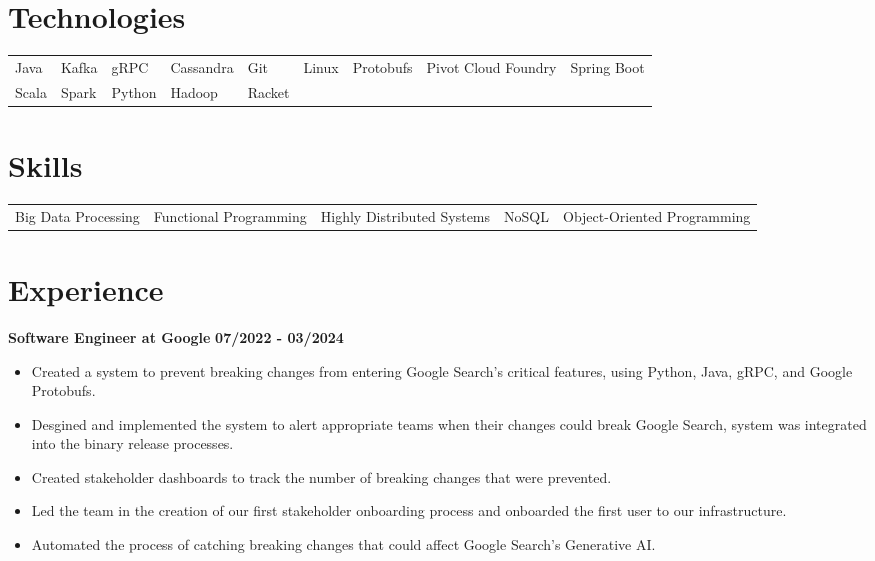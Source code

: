 \documentclass{res}
\begin{document}
\address{www.anthonyhicksiii.com}
\address{ahicks3rd@gmail.com}

\setlength\itemsep{0em}

\begin{resume}
\section{\large{Technologies}}
\begin{tabular}{l	l	l 	l	l   l	l 	l 	l} 
	Java  & Kafka   & gRPC & Cassandra  & Git & Linux & Protobufs & Pivot Cloud Foundry & Spring Boot \\ 
	Scala & Spark & Python & Hadoop & Racket
\end{tabular}

\section{\large{Skills}}
\begin{tabular}{	l 	l 	l 	l	l 	}
	Big Data Processing & Functional Programming & Highly Distributed Systems & NoSQL & Object-Oriented Programming 
\end{tabular}

\section{\large{Experience}}
	\textbf{Software Engineer at Google}
	\hfill{\bf 07/2022 - 03/2024}
	\begin{itemize}
		\item Created a system to prevent breaking changes from entering Google Search's critical features, using Python, Java, gRPC, and Google Protobufs.
		\item Desgined and implemented the system to alert appropriate teams when their changes could break Google Search, system was integrated into the binary release processes. 
		\item Created stakeholder dashboards to track the number of breaking changes that were prevented.
		\item Led the team in the creation of our first stakeholder onboarding process and onboarded the first user to our infrastructure.
		\item Automated the process of catching breaking changes that could affect Google Search's Generative AI.
	\end{itemize}
	

\end{resume}
\end{document}
